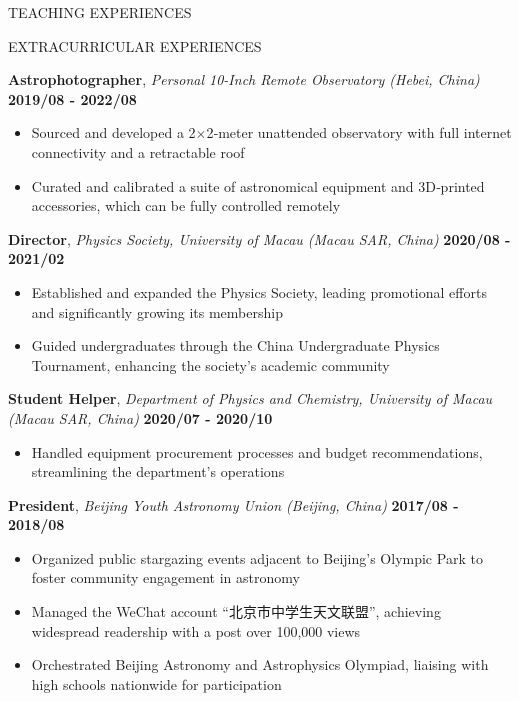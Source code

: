 \documentclass[10pt]{article} %
\begin{document}
\begin{section}{TEACHING EXPERIENCES}
\end{section}

\begin{section}{EXTRACURRICULAR EXPERIENCES}
    
\textbf{Astrophotographer}, \textit{Personal 10-Inch Remote Observatory (Hebei, China)} \hfill \textbf{2019/08 - 2022/08}
\begin{itemize}[leftmargin=1.5em]
    \item Sourced and developed a 2$\times$2‑meter unattended observatory with full internet connectivity and a retractable roof
    \item Curated and calibrated a suite of astronomical equipment and 3D‑printed accessories, which can be fully controlled remotely
\end{itemize}

\textbf{Director}, \textit{Physics Society, University of Macau (Macau SAR, China)} \hfill \textbf{2020/08 - 2021/02} 
\begin{itemize}[leftmargin=1.5em]
    \item Established and expanded the Physics Society, leading promotional efforts and significantly growing its membership
    \item Guided undergraduates through the China Undergraduate Physics Tournament, enhancing the society's academic community
\end{itemize}

\textbf{Student Helper}, \textit{Department of Physics and Chemistry, University of Macau (Macau SAR, China)} \hfill \textbf{2020/07 - 2020/10} 
\begin{itemize}[leftmargin=1.5em]
    \item Handled equipment procurement processes and budget recommendations, streamlining the department's operations
\end{itemize}

\textbf{President}, \textit{Beijing Youth Astronomy Union (Beijing, China)} \hfill \textbf{2017/08 - 2018/08} 
\begin{itemize}[leftmargin=1.5em]
    \item Organized public stargazing events adjacent to Beijing's Olympic Park to foster community engagement in astronomy
    \item Managed the WeChat account ``北京市中学生天文联盟'', achieving widespread readership with a post over 100,000 views
    \item Orchestrated Beijing Astronomy and Astrophysics Olympiad, liaising with high schools nationwide for participation
\end{itemize}


\end{section}
\end{document}
